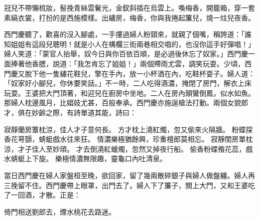 \begin{showcontents}{}
冠兒不帶懶梳妝，髻挽青絲雲鬢光，金釵斜插在烏雲上。喚梅香，開籠箱，穿一套素縞衣裳，打扮的是西施模樣。出繡房，梅香，你與我捲起簾兒，燒一炷兒夜香。

西門慶聽了，歡喜的沒入腳處，一手摟過婦人粉頸來，就親了個嘴，稱誇道：「誰知姐姐有這段兒聰明！就是小人在構欄三街兩巷相交唱的，也沒你這手好彈唱！」 婦人笑道：「蒙官人抬舉，奴今日與你百依百順，是必過後休忘了奴家。」西門慶一面捧著他香腮，說道：「我怎肯忘了姐姐！」兩個殢雨尤雲，調笑玩耍。少頃，西門慶又脫下他一隻繡花鞋兒，擎在手內，放一小杯酒在內，吃鞋杯耍子。婦人道：「奴家好小腳兒，你休要笑話。」不一時，二人吃得酒濃，掩閉了房門，解衣上床玩耍。王婆把大門頂著，和迎兒在廚房中坐地。二人在房內顛鸞倒鳳，似水如魚。那婦人枕邊風月，比娼妓尤甚，百般奉承。西門慶亦施逞槍法打動。兩個女貌郎才，俱在妙齡之際，有詩單道其能，詩曰：

寂靜蘭房簟枕涼，佳人才子意何長。
方才枕上澆紅燭，忽又偷來火隔牆。
粉蝶探香花萼顫，蜻蜓戲水往來狂。
情濃樂極猶餘興，珍重檀郎莫相忘。
寂靜閨房單枕涼，才子佳人至妙頑。
才去倒澆紅蠟燭，忽然又掉夜行船。
偷香粉蝶飧花蕊，戲水蜻蜓上下旋。
樂極情濃無限趣，靈龜口內吐清泉。

當日西門慶在婦人家盤桓至晚，欲回家，留了幾兩散碎銀子與婦人做盤纏。婦人再三挽留不住。西門慶帶上眼罩，出門去了。婦人下了簾子，關上大門，又和王婆吃了一回酒，才散。正是：

倚門相送劉郎去，煙水桃花去路迷。






\end{showcontents}

